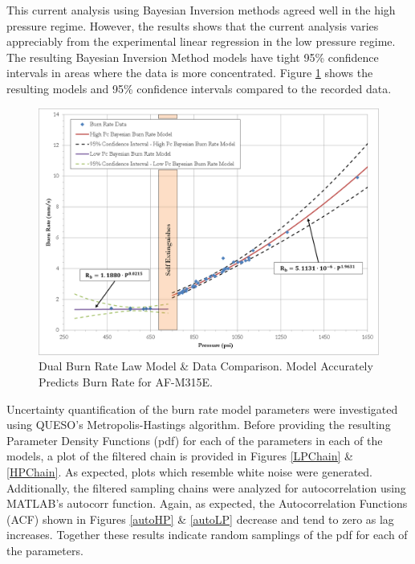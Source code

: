 \documentclass{article}
\begin{document}
This current analysis using Bayesian Inversion methods agreed well in the high pressure regime. However, the
results shows that the current analysis varies appreciably from the experimental linear regression in the low
pressure regime. The resulting Bayesian Inversion Method models have tight 95\% confidence intervals in 
areas where the data is more concentrated. Figure \ref{DualBRfig} shows the resulting models and 95\% confidence 
intervals compared to the recorded data.

\begin{figure}[htb!]
\centering
\includegraphics[width=0.25\textheight]{Dual_Burn_Rate_Results.png}
\caption{Dual Burn Rate Law Model \& Data Comparison. Model Accurately Predicts Burn Rate for AF-M315E.}
\label{DualBRfig}
\end{figure}

Uncertainty quantification of the burn rate model parameters were investigated using QUESO's Metropolis-Hastings
algorithm. Before providing the resulting Parameter Density Functions (pdf) for each of the parameters in each of 
the models, a plot of the filtered chain is provided in Figures \ref{LPChain} \& \ref{HPChain}. As expected, 
plots which resemble white noise were generated. Additionally, the filtered sampling chains were analyzed for
autocorrelation using MATLAB's autocorr function. Again, as expected, the Autocorrelation Functions (ACF) shown in
Figures \ref{autoHP} \& \ref{autoLP} decrease and tend to zero as lag increases. Together these results indicate
random samplings of the pdf for each of the parameters.
\end{document}
